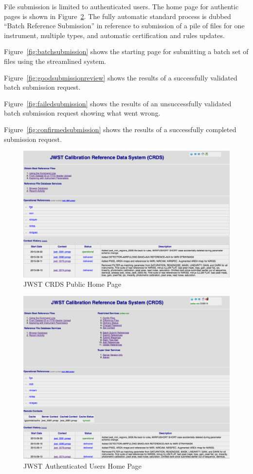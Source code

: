 \documentclass[final,authoryear,5p,times,twocolumn]{elsarticle}
\begin{document}
File submission is limited to authenticated users. The home page for
authentic pages is shown in Figure~\ref{fig:authenticatedhome}.
The fully automatic
standard process is dubbed ``Batch Reference Submission'' 
in reference to submission of a pile of files for one instrument,
multiple types,  and automatic certification and rules updates.

Figure~\ref{fig:batchsubmission} shows the starting page for submitting
a batch set of files using the streamlined system.

Figure~\ref{fig:goodsubmissionreview} shows the results of a successfully validated batch  submission request.

Figure~\ref{fig:failedsubmission} shows the results of an unsuccessfully validated batch submission request showing what went wrong.

Figure~\ref{fig:confirmedsubmission} shows the results of a successfully completed submission request.


\begin{figure}[ht!]
\centering
\includegraphics[width=180mm]{JWST_Public_Home_Page.png}
\caption{JWST CRDS Public Home Page}
\label{fig:publichome}
\end{figure}

\begin{figure}[ht!]
\centering
\includegraphics[width=180mm]{JWST_Authenticated_Home.png}
\caption{JWST Authenticated Users Home Page}
\label{fig:authenticatedhome}
\end{figure}
\end{document}
